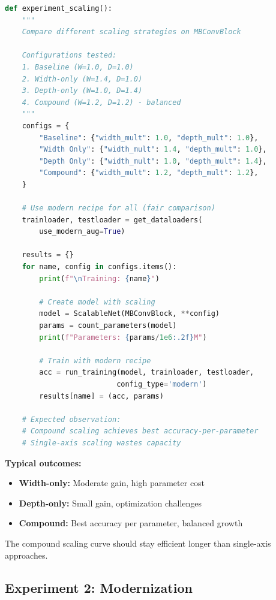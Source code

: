 \documentclass{article}
\begin{document}
\begin{lstlisting}[language=Python, caption=Scaling Experiment]
def experiment_scaling():
    """
    Compare different scaling strategies on MBConvBlock
    
    Configurations tested:
    1. Baseline (W=1.0, D=1.0)
    2. Width-only (W=1.4, D=1.0) 
    3. Depth-only (W=1.0, D=1.4)
    4. Compound (W=1.2, D=1.2) - balanced
    """
    configs = {
        "Baseline": {"width_mult": 1.0, "depth_mult": 1.0},
        "Width Only": {"width_mult": 1.4, "depth_mult": 1.0},
        "Depth Only": {"width_mult": 1.0, "depth_mult": 1.4},
        "Compound": {"width_mult": 1.2, "depth_mult": 1.2},
    }
    
    # Use modern recipe for all (fair comparison)
    trainloader, testloader = get_dataloaders(
        use_modern_aug=True)
    
    results = {}
    for name, config in configs.items():
        print(f"\nTraining: {name}")
        
        # Create model with scaling
        model = ScalableNet(MBConvBlock, **config)
        params = count_parameters(model)
        print(f"Parameters: {params/1e6:.2f}M")
        
        # Train with modern recipe
        acc = run_training(model, trainloader, testloader,
                          config_type='modern')
        results[name] = (acc, params)
    
    # Expected observation:
    # Compound scaling achieves best accuracy-per-parameter
    # Single-axis scaling wastes capacity
\end{lstlisting}

\begin{tcolorbox}[colback=blue!5!white, colframe=blue!75!black, title=Expected Results]
\textbf{Typical outcomes:}
\begin{itemize}
    \item \textbf{Width-only:} Moderate gain, high parameter cost
    \item \textbf{Depth-only:} Small gain, optimization challenges
    \item \textbf{Compound:} Best accuracy per parameter, balanced growth
\end{itemize}

The compound scaling curve should stay efficient longer than single-axis approaches.
\end{tcolorbox}

\subsection{Experiment 2: Modernization}
\end{document}
